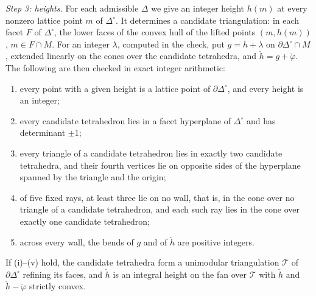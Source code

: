 \emph{Step 3: heights.} For each admissible $\Delta$ we give an integer height $h(m)$ at every nonzero lattice point
$m$ of $\Delta^\circ$. It determines a candidate triangulation: in each facet $F$ of
$\Delta^\circ$, the lower faces of the convex hull of the lifted points $(m,h(m))$, $m\in F\cap M$. For an integer $\lambda$, computed in the check, put $g=h+\lambda$
on $\partial\Delta^\circ\cap M$, extended linearly on the cones over the candidate tetrahedra, and $\check h=g+\check\varphi$.
The following are then checked in exact integer arithmetic:
\begin{enumerate}
\item[(i)] every point with a given height is a lattice point of $\partial\Delta^\circ$, and every height is an integer;
\item[(ii)] every candidate tetrahedron lies in a facet hyperplane of $\Delta^\circ$ and has determinant $\pm1$;
\item[(iii)] every triangle of a candidate tetrahedron lies in exactly two candidate tetrahedra, and their fourth vertices
lie on opposite sides of the hyperplane spanned by the triangle and the origin;
\item[(iv)] of five fixed rays, at least three lie on no wall, that is, in the cone over no triangle of a candidate
tetrahedron, and each such ray lies in the cone over exactly one candidate tetrahedron;
\item[(v)] across every wall, the bends of $g$ and of $\check h$ are positive integers.
\end{enumerate}

\begin{lemma}\label{lem:Ucert}
If (i)--(v) hold, the candidate tetrahedra form a unimodular triangulation $\mathcal T$ of $\partial\Delta^\circ$ refining its
faces, and $\check h$ is an integral height on the fan over $\mathcal T$ with $\check h$ and $\check h-\check\varphi$ strictly
convex.
\end{lemma}

